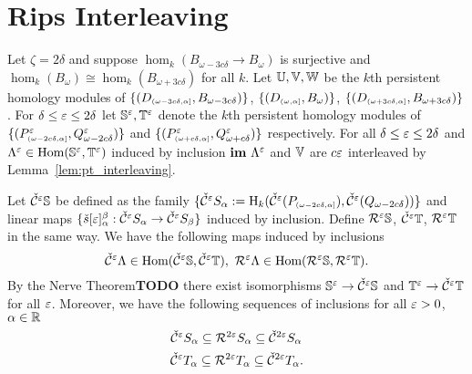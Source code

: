
\section{Rips Interleaving}

%

Let $\zeta=2\delta$ and suppose $\hom_k(B_{\omega-3c\delta}\to B_\omega)$ is surjective and $\hom_k(B_\omega)\cong\hom_k(B_{\omega+3c\delta})$ for all $k$.
Let $\U, \V, \W$ be the $k$th persistent homology modules of $\{(D\subi{\omega-3c\of, \alpha}, B_{\omega-3c\of})\}$, $\{(D\subi{\omega,\alpha}, \B)\}$, $\{(D\subi{\omega+3c\of,\alpha}, B_{\omega+3c\of})\}$.
For $\delta\leq\e\leq 2\delta$ let $\S^\e, \T^\e$ denote the $k$th persistent homology modules of $\{(P^\e\subi{\omega-2c\of,\alpha},Q_{\omega-2c\of}^\e)\}$ and $\{(P^\e\subi{\omega+c\of,\alpha},\QQ^\e)\}$ respectively.
For all $\delta\leq\e\leq 2\delta$ and $\Lambda^\e\in\Hom(\S^\e, \T^\e)$ induced by inclusion $\im~\Lambda^\e$ and $\V$ are $c\e$ interleaved by Lemma~\ref{lem:pt_interleaving}.


Let $\cech^\e\S$ be defined as the family $\{\cech^\e S_\alpha := \hom_k(\cech^\e(P\subi{\omega-2c\delta, \alpha}), \cech^\e(Q_{\omega-2c\delta}))\}$ and linear maps $\{\check{s}[\e]_\alpha^\beta : \cech^\e S_\alpha\to \cech^\e S_\beta\}$ induced by inclusion.
Define $\rips^\e\S$, $\cech^\e\T$, $\rips^\e\T$ in the same way.
We have the following maps induced by inclusions
\[ \cech^\e\Lambda\in\Hom(\cech^\e\S,\cech^\e\T),\ \rips^\e\Lambda\in\Hom(\rips^\e\S,\rips^\e\T).\]
By the Nerve Theorem\textbf{TODO} there exist isomorphisms $\S^\e\to \cech^\e\S$ and $\T^\e\to\cech^\e\T$ for all $\e$.
Moreover, we have the following sequences of inclusions for all $\e > 0$, $\alpha\in\R$
\[ \cech^\e S_\alpha\subseteq \rips^{2\e} S_\alpha \subseteq \cech^{2\e} S_\alpha \]
\[ \cech^\e T_\alpha\subseteq \rips^{2\e} T_\alpha \subseteq \cech^{2\e} T_\alpha. \]

